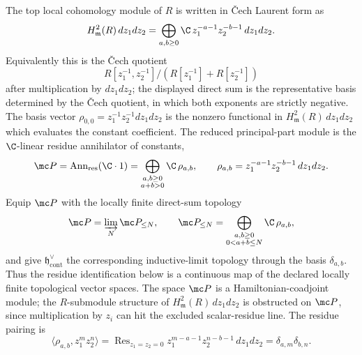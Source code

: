 \begin{defn}
\label{def:app-matlis-principal-parts}
  The top local cohomology module of \(R\) is written in \v{C}ech
  Laurent form as
  \[
    H^2_{\mathfrak m}(R)\,dz_1dz_2
      =\bigoplus_{a,b\geq0}
        \C\,z_1^{-a-1}z_2^{-b-1}\,dz_1dz_2 .
  \]
  Equivalently this is the \v{C}ech quotient
  \[
    R[z_1^{-1},z_2^{-1}]/(R[z_1^{-1}]+R[z_2^{-1}])
  \]
  after multiplication by \(dz_1dz_2\); the displayed direct sum is
  the representative basis determined by the \v{C}ech quotient, in
  which both exponents are
  strictly negative.
  The basis vector \(\rho_{0,0}=z_1^{-1}z_2^{-1}dz_1dz_2\) is the nonzero
  functional in \(H^2_{\mathfrak m}(R)\,dz_1dz_2\) which evaluates
  the constant coefficient.  The reduced principal-part module is the
  \(\C\)-linear residue annihilator of constants,
  \[
    \mc P=\operatorname{Ann}_{\mathrm{res}}(\C\cdot1)
      =\bigoplus_{\substack{a,b\geq0\\a+b>0}}\C\,\rho_{a,b},
      \qquad
    \rho_{a,b}=z_1^{-a-1}z_2^{-b-1}\,dz_1dz_2 .
  \]
  Equip \(\mc P\) with the locally finite direct-sum topology
  \[
    \mc P=\varinjlim_N \mc P_{\leq N},\qquad
    \mc P_{\leq N}
      =\bigoplus_{\substack{a,b\geq0\\0<a+b\leq N}}\C\,\rho_{a,b},
  \]
  and give \(\mathfrak h^\vee_{\mathrm{cont}}\) the corresponding
  inductive-limit topology through the basis \(\delta_{a,b}\).  Thus the
  residue identification below is a continuous map of the declared
  locally finite topological vector spaces.  The space \(\mc P\) is a
  Hamiltonian-coadjoint module; the \(R\)-submodule structure of
  \(H^2_{\mathfrak m}(R)\,dz_1dz_2\) is
  obstructed on \(\mc P\), since
  multiplication by \(z_i\) can hit the excluded scalar-residue line.
  The residue pairing is
  \[
    \langle \rho_{a,b},z_1^m z_2^n\rangle
      =\operatorname{Res}_{z_1=z_2=0}
        z_1^{m-a-1}z_2^{n-b-1}\,dz_1dz_2
      =\delta_{a,m}\delta_{b,n}.
  \]
\end{defn}

